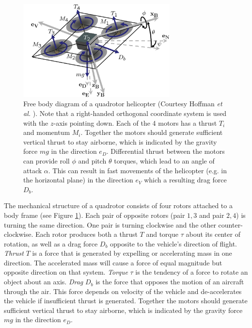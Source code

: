 \begin{figure}[htb]
\centering
\includegraphics[width=8cm]{images/QuadRotorBody.png}
\caption{Free body diagram of a quadrotor helicopter 
(Courtesy Hoffman \textit{et al.} \cite{Hoffmann2007}). Note that a right-handed orthogonal coordinate system is used with the $z$-axis pointing down. Each of the 4 motors has a thrust $T_i$ and momentum $M_i$. Together the motors should generate sufficient vertical thrust to stay airborne, which is indicated by the gravity force $mg$ in the direction $e_D$. Differential thrust between the motors can provide roll $\phi$ and pitch $\theta$ torques, which lead to an angle of attack $\alpha$. This can result in fast movements of the helicopter (e.g. in the horizontal plane) in the direction $e_V$ which a resulting drag force $D_b$. }
\label{fig:QuadRotorBody}
\end{figure}

The mechanical structure of a quadrotor consists of four rotors attached to a body frame (see Figure \ref{fig:QuadRotorBody}).
Each pair of opposite rotors (pair ${1, 3}$ and pair ${2, 4}$) is turning the same direction.
One pair is turning clockwise and the other counter-clockwise.
Each rotor produces both a thrust $T$ and torque $\tau$ about its center of rotation, as well as a drag force $D_b$ opposite to the vehicle's direction of flight.
\textit{Thrust} $T$ is a force that is generated by expelling or accelerating mass in one direction.
The accelerated mass will cause a force of equal magnitude but opposite direction on that system.
\textit{Torque} $\tau$ is the tendency of a force to rotate an object about an axis.
\textit{Drag} $D_b$ is the force that opposes the motion of an aircraft through the air.
This force depends on velocity of the vehicle and de-accelerates the vehicle if insufficient thrust is generated.
Together the motors should generate sufficient vertical thrust to stay airborne, which is indicated by the gravity force $mg$ in the direction $e_D$.

